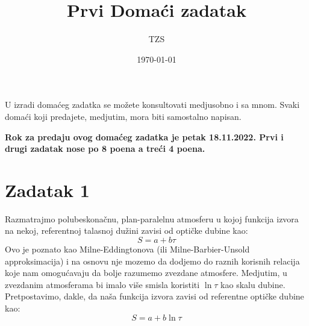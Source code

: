 \documentclass[12pt]{article}
\title{Prvi Doma\'{c}i zadatak}
\author{TZS}
\date{\today}
\begin{document}
\maketitle

U izradi doma\'{c}eg zadatka se mo\v{z}ete konsultovati medjusobno i sa mnom. Svaki doma\'{c}i koji predajete, medjutim, mora biti samostalno napisan. 

\textbf{Rok za predaju ovog doma\'{c}eg zadatka je petak 18.11.2022. Prvi i drugi zadatak nose po 8 poena a tre\'{c}i 4 poena.}

\section*{Zadatak 1}

Razmatrajmo polubeskona\v{c}nu, plan-paralelnu atmosferu u kojoj funkcija izvora na nekoj, referentnoj talasnoj du\v{z}ini zavisi od opti\v{c}ke dubine kao:
\begin{equation}
S = a + b\tau
\end{equation}
Ovo je poznato kao Milne-Eddingtonova (ili Milne-Barbier-Unsold approksimacija) i na osnovu nje mozemo da dodjemo do raznih korisnih relacija koje nam omogu\'{c}avaju da bolje razumemo zvezdane atmosfere. Medjutim, u zvezdanim atmosferama bi imalo vi\v{s}e smisla koristiti $\ln \tau$ kao skalu dubine. Pretpostavimo, dakle, da na\v{s}a funkcija izvora zavisi od referentne opti\v{c}ke dubine kao:
\begin{equation}
S = a + b\ln\tau
\end{equation}
\end{document}
